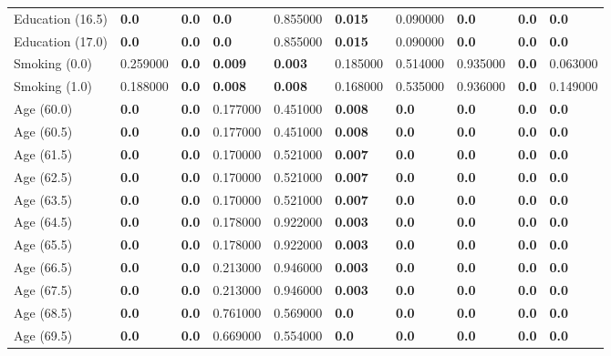 \begin{tabular}{llllllllll}
Education (16.5) & \textbf{0.0} & \textbf{0.0} & \textbf{0.0} & 0.855000 & \textbf{0.015} & 0.090000 & \textbf{0.0} & \textbf{0.0} & \textbf{0.0} \\
Education (17.0) & \textbf{0.0} & \textbf{0.0} & \textbf{0.0} & 0.855000 & \textbf{0.015} & 0.090000 & \textbf{0.0} & \textbf{0.0} & \textbf{0.0} \\
Smoking (0.0) & 0.259000 & \textbf{0.0} & \textbf{0.009} & \textbf{0.003} & 0.185000 & 0.514000 & 0.935000 & \textbf{0.0} & 0.063000 \\
Smoking (1.0) & 0.188000 & \textbf{0.0} & \textbf{0.008} & \textbf{0.008} & 0.168000 & 0.535000 & 0.936000 & \textbf{0.0} & 0.149000 \\
Age (60.0) & \textbf{0.0} & \textbf{0.0} & 0.177000 & 0.451000 & \textbf{0.008} & \textbf{0.0} & \textbf{0.0} & \textbf{0.0} & \textbf{0.0} \\
Age (60.5) & \textbf{0.0} & \textbf{0.0} & 0.177000 & 0.451000 & \textbf{0.008} & \textbf{0.0} & \textbf{0.0} & \textbf{0.0} & \textbf{0.0} \\
Age (61.5) & \textbf{0.0} & \textbf{0.0} & 0.170000 & 0.521000 & \textbf{0.007} & \textbf{0.0} & \textbf{0.0} & \textbf{0.0} & \textbf{0.0} \\
Age (62.5) & \textbf{0.0} & \textbf{0.0} & 0.170000 & 0.521000 & \textbf{0.007} & \textbf{0.0} & \textbf{0.0} & \textbf{0.0} & \textbf{0.0} \\
Age (63.5) & \textbf{0.0} & \textbf{0.0} & 0.170000 & 0.521000 & \textbf{0.007} & \textbf{0.0} & \textbf{0.0} & \textbf{0.0} & \textbf{0.0} \\
Age (64.5) & \textbf{0.0} & \textbf{0.0} & 0.178000 & 0.922000 & \textbf{0.003} & \textbf{0.0} & \textbf{0.0} & \textbf{0.0} & \textbf{0.0} \\
Age (65.5) & \textbf{0.0} & \textbf{0.0} & 0.178000 & 0.922000 & \textbf{0.003} & \textbf{0.0} & \textbf{0.0} & \textbf{0.0} & \textbf{0.0} \\
Age (66.5) & \textbf{0.0} & \textbf{0.0} & 0.213000 & 0.946000 & \textbf{0.003} & \textbf{0.0} & \textbf{0.0} & \textbf{0.0} & \textbf{0.0} \\
Age (67.5) & \textbf{0.0} & \textbf{0.0} & 0.213000 & 0.946000 & \textbf{0.003} & \textbf{0.0} & \textbf{0.0} & \textbf{0.0} & \textbf{0.0} \\
Age (68.5) & \textbf{0.0} & \textbf{0.0} & 0.761000 & 0.569000 & \textbf{0.0} & \textbf{0.0} & \textbf{0.0} & \textbf{0.0} & \textbf{0.0} \\
Age (69.5) & \textbf{0.0} & \textbf{0.0} & 0.669000 & 0.554000 & \textbf{0.0} & \textbf{0.0} & \textbf{0.0} & \textbf{0.0} & \textbf{0.0} \\

\end{tabular}
